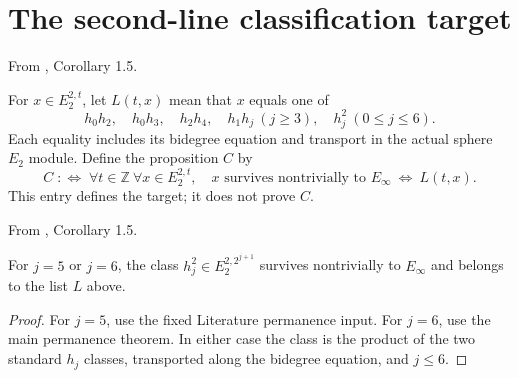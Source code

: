 \section{The second-line classification target}
\begin{definition}
\label{sem:Main:two-line-classification-goal}
From \cite{LWX126}, Corollary 1.5.\par
For $x\in E_2^{2,t}$, let $L(t,x)$ mean that $x$ equals one of
\[
 h_0h_2,\quad h_0h_3,\quad h_2h_4,\quad h_1h_j\ (j\geq3),\quad h_j^2\ (0\leq j\leq6).
\]
Each equality includes its bidegree equation and transport in the actual sphere $E_2$ module. Define the proposition $C$ by
\[
 C\;:\!\Longleftrightarrow\;\forall t\in\mathbb Z\ \forall x\in E_2^{2,t},\quad
 x\text{ survives nontrivially to }E_\infty\ \Longleftrightarrow\ L(t,x).
\]
This entry defines the target; it does not prove $C$.
\end{definition}

\begin{theorem}
\label{sem:Main:two-line-known-squares}
From \cite{LWX126}, Corollary 1.5.\par
For $j=5$ or $j=6$, the class $h_j^2\in E_2^{2,2^{j+1}}$ survives nontrivially to $E_\infty$ and belongs to the list $L$ above.
\end{theorem}
\begin{proof}
For $j=5$, use the fixed Literature permanence input. For $j=6$, use the main permanence theorem. In either case the class is the product of the two standard $h_j$ classes, transported along the bidegree equation, and $j\leq6$.
\end{proof}

